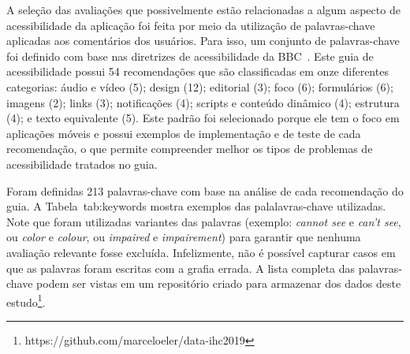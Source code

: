 A seleção das avaliações que possivelmente estão relacionadas a algum aspecto de acessibilidade da aplicação foi feita por meio da utilização de palavras-chave aplicadas aos comentários dos usuários. 
Para isso, um conjunto de palavras-chave foi definido com base nas diretrizes de acessibilidade da BBC~\cite{bbc}. Este guia de acessibilidade possui 54 recomendações que são classificadas em onze diferentes categorias: áudio e vídeo (5); design (12); editorial (3); foco (6); formulários (6); imagens (2); links (3); notificações (4); scripts e conteúdo dinâmico (4); estrutura (4); e texto equivalente (5). 
Este padrão foi selecionado porque ele tem o foco em aplicações móveis e possui exemplos de implementação e de teste de cada recomendação, o que permite compreender melhor os tipos de problemas de acessibilidade tratados no guia. 

Foram definidas 213 palavras-chave com base na análise de cada recomendação do guia. 
A Tabela~{tab:keywords} mostra exemplos das palalavras-chave utilizadas.
Note que foram utilizadas variantes das palavras (exemplo: \textit{cannot see} e \textit{can't see}, ou \textit{color} e \textit{colour}, ou \textit{impaired} e \textit{impairement}) para garantir que nenhuma avaliação relevante fosse excluída. Infelizmente, não é possível capturar casos em que as palavras foram escritas com a grafia errada. A lista completa das palavras-chave podem ser vistas em um repositório criado para armazenar dos dados deste estudo\footnote{https://github.com/marceloeler/data-ihc2019}.


